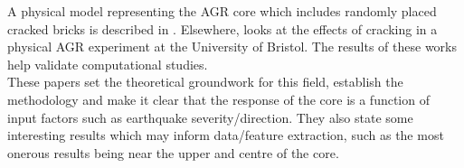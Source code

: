 \noindent
A physical model representing the AGR core which includes randomly placed cracked bricks is described in \cite{dihoru2017development}. Elsewhere, \cite{oddbjornsson2017physical} looks at the effects of cracking in a physical AGR experiment at the University of Bristol. The results of these works help validate computational studies.\\ 

\noindent
These papers set the theoretical groundwork for this field, establish the methodology and make it clear that the response of the core is a function of input factors such as earthquake severity/direction. They also state some interesting results which may inform data/feature extraction, such as the most onerous results being near the upper and centre of the core.

